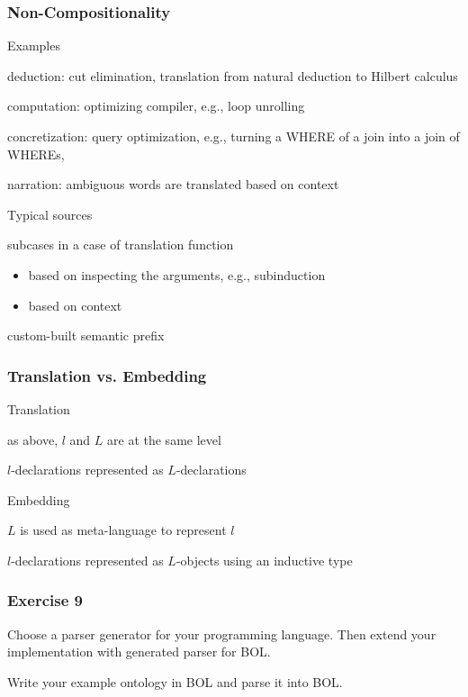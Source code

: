 \begin{frame}\frametitle{Non-Compositionality}
\begin{blockitems}{Examples}
 \item deduction: cut elimination, translation from natural deduction to Hilbert calculus
 \item computation: optimizing compiler, e.g., loop unrolling
 \item concretization: query optimization, e.g., turning a WHERE of a join into a join of WHEREs,
 \item narration: ambiguous words are translated based on context
\end{blockitems}

\begin{blockitems}{Typical sources}
 \item subcases in a case of translation function
  \begin{itemize}
  \item based on inspecting the arguments, e.g., subinduction
  \item based on context
  \end{itemize}
 \item custom-built semantic prefix
\end{blockitems}
\end{frame}

\begin{frame}\frametitle{Translation vs. Embedding}
\begin{blockitems}{Translation}
\item as above, $l$ and $L$ are at the same level
\item $l$-declarations represented as $L$-declarations
\end{blockitems}

\begin{blockitems}{Embedding}
\item $L$ is used as meta-language to represent $l$
\item $l$-declarations represented as $L$-objects using an inductive type
\end{blockitems}
\end{frame}

\begin{frame}[fragile]\frametitle{Exercise 9}
Choose a parser generator for your programming language.
Then extend your implementation with generated parser for BOL.

Write your example ontology in BOL and parse it into BOL.
\end{frame}

